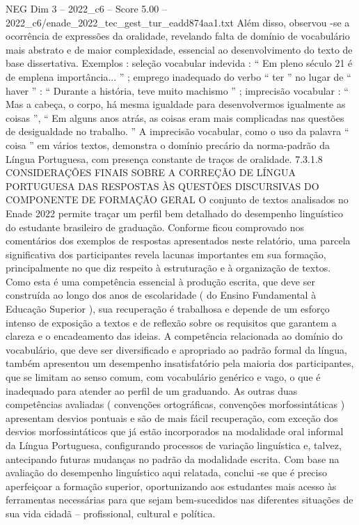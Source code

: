 \begin{textsample}{NEG Dim 3 – 2022\_c6 – Score 5.00 – 2022\_c6/enade\_2022\_tec\_gest\_tur\_eadd874aa1.txt}
Além disso, observou -se a ocorrência de expressões da oralidade, revelando falta de domínio de vocabulário mais abstrato e de maior complexidade, essencial ao desenvolvimento do texto de base dissertativa.
Exemplos : seleção vocabular indevida : “ Em pleno século 21 é de emplena importância... ” ; emprego inadequado do verbo “ ter ” no lugar de “ haver ” : “ Durante a história, teve muito machismo ” ; imprecisão vocabular : “ Mas a cabeça, o corpo, há mesma igualdade para desenvolvermos igualmente as coisas ”, “ Em alguns anos atrás, as coisas eram mais complicadas nas questões de desigualdade no trabalho. ” A imprecisão vocabular, como o uso da palavra “ coisa ” em vários textos, demonstra o domínio precário da norma-padrão da Língua Portuguesa, com presença constante de traços de oralidade. 7.3.1.8 CONSIDERAÇÕES FINAIS SOBRE A CORREÇÃO DE LÍNGUA PORTUGUESA DAS RESPOSTAS ÀS QUESTÕES DISCURSIVAS DO COMPONENTE DE FORMAÇÃO GERAL O conjunto de textos analisados no Enade 2022 permite traçar um perfil bem detalhado do desempenho linguístico do estudante brasileiro de graduação.
Conforme ficou comprovado nos comentários dos exemplos de respostas apresentados neste relatório, uma parcela significativa dos participantes revela lacunas importantes em sua formação, principalmente no que diz respeito à estruturação e à organização de textos.
Como esta é uma competência essencial à produção escrita, que deve ser construída ao longo dos anos de escolaridade ( do Ensino Fundamental à Educação Superior ), sua recuperação é trabalhosa e depende de um esforço intenso de exposição a textos e de reflexão sobre os requisitos que garantem a clareza e o encadeamento das ideias.
A competência relacionada ao domínio do vocabulário, que deve ser diversificado e apropriado ao padrão formal da língua, também apresentou um desempenho insatisfatório pela maioria dos participantes, que se limitam ao senso comum, com vocabulário genérico e vago, o que é inadequado para atender ao perfil de um graduando.
As outras duas competências avaliadas ( convenções ortográficas, convenções morfossintáticas ) apresentam desvios pontuais e são de mais fácil recuperação, com exceção dos desvios morfossintáticos que já estão incorporados na modalidade oral informal da Língua Portuguesa, configurando processos de variação linguística e, talvez, antecipando futuras mudanças no padrão da modalidade escrita.
Com base na avaliação do desempenho linguístico aqui relatada, conclui -se que é preciso aperfeiçoar a formação superior, oportunizando aos estudantes mais acesso às ferramentas necessárias para que sejam bem-sucedidos nas diferentes situações de sua vida cidadã – profissional, cultural e política.

\end{textsample}
